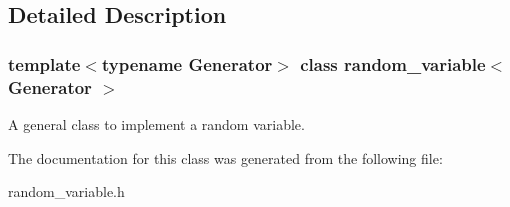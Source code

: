 \subsection{Detailed Description}
\subsubsection*{template$<$typename Generator$>$\newline
class random\+\_\+variable$<$ Generator $>$}

A general class to implement a random variable. 

The documentation for this class was generated from the following file\+:\begin{DoxyCompactItemize}
\item 
random\+\_\+variable.\+h\end{DoxyCompactItemize}
